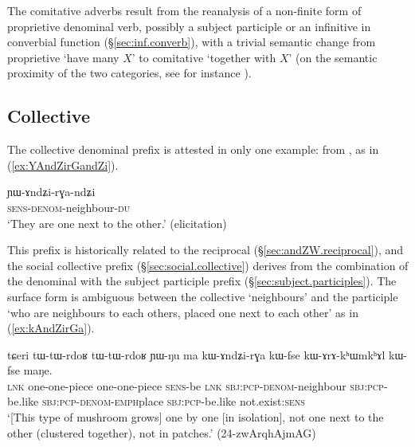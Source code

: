 The comitative adverbs result from the reanalysis of a non-finite form of proprietive  denominal verb, possibly a subject participle or an infinitive in converbial function (§\ref{sec:inf.converb}), with a trivial semantic change from proprietive `have many $X$' to comitative `together with $X$' (on the semantic proximity of the two categories, see for instance \citealt{sutton76having, patz91djabugay, stassen00and, stolz06comitative, arkhipov09comitative}).
 

\subsection{Collective  } \label{sec:denom.andZi}
The  collective denominal prefix is attested in only one example: 
 from , as in (\ref{ex:YAndZirGandZi}). 

\begin{exe}
\ex \label{ex:YAndZirGandZi}
\gll ɲɯ-ɤndʑi-rɣa-ndʑi \\
\textsc{sens}-\textsc{denom}-neighbour-\textsc{du} \\
\glt `They are one next to the other.' (elicitation)
\end{exe}

This prefix is historically related to the  reciprocal (§\ref{sec:andZW.reciprocal}), and the social collective  prefix (§\ref{sec:social.collective}) derives from the combination of the denominal  with the  subject participle prefix (§\ref{sec:subject.participles}). The surface form  is ambiguous between the collective `neighbours' and the participle `who are neighbours to each others, placed one next to each other' as in (\ref{ex:kAndZirGa}).


\begin{exe}
\ex \label{ex:kAndZirGa}
\gll  tɕeri tɯ-tɯ-rdoʁ tɯ-tɯ-rdoʁ ɲɯ-ŋu ma kɯ-ɤndʑi-rɣa kɯ-fse kɯ-ɤrɤ-kʰɯm\redp{}kʰɤl kɯ-fse maŋe. \\
\textsc{lnk} one-one-piece one-one-piece  \textsc{sens}-be \textsc{lnk} \textsc{sbj}:\textsc{pcp}-\textsc{denom}-neighbour \textsc{sbj}:\textsc{pcp}-be.like \textsc{sbj}:\textsc{pcp}-\textsc{denom}-\textsc{emph}\redp{}place  \textsc{sbj}:\textsc{pcp}-be.like not.exist:\textsc{sens} \\
\glt `[This type of mushroom grows] one by one [in isolation], not one next to the other (clustered together), not in patches.' (24-zwArqhAjmAG) 
\end{exe}


